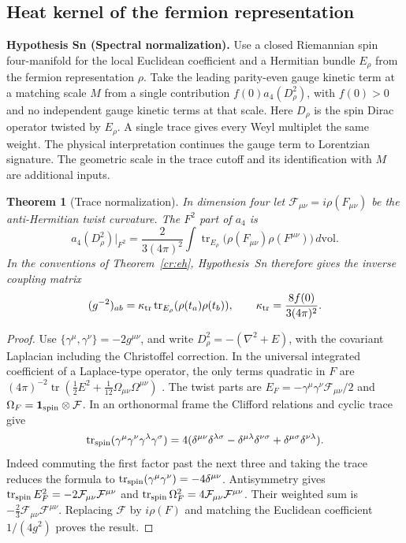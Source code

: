 \documentclass[aps,pra,onecolumn,superscriptaddress,nofootinbib,10pt]{revtex4-2}
\newtheorem{theorem}{Theorem}
\theoremstyle{definition}
\theoremstyle{remark}
\begin{document}
\subsection{Heat kernel of the fermion representation}

\smallskip\noindent\textbf{Hypothesis Sn (Spectral normalization).}  Use a closed Riemannian spin four-manifold for the local Euclidean
coefficient and a Hermitian bundle $E_\rho$ from the fermion
representation $\rho$. Take the leading parity-even gauge kinetic
term at a matching scale $M$ from a single contribution
$f(0)a_4(D_\rho^2)$, with $f(0)>0$ and no independent gauge kinetic
terms at that scale. Here $D_\rho$ is the spin Dirac operator twisted
by $E_\rho$. A single trace gives every Weyl multiplet the same weight.
The physical interpretation continues the gauge term to Lorentzian
signature. The geometric scale in the trace cutoff and its
identification with $M$ are additional inputs.


\begin{theorem}[Trace normalization]\label{cr:heat}
In dimension four let $\mathcal F_{\mu\nu}=i\rho(F_{\mu\nu})$
be the anti-Hermitian twist curvature. The $F^2$ part of $a_4$ is
\begin{equation}\label{cr:a4}
 a_4(D_\rho^2)\big|_{F^2}
   =\frac{2}{3(4\pi)^2}\int
            \operatorname{tr}_{E_\rho}
               \big(\rho(F_{\mu\nu})\rho(F^{\mu\nu})\big)\,d\mathrm{vol}.
\end{equation}
In the conventions of Theorem~\ref{cr:eh}, Hypothesis~Sn
therefore gives the inverse coupling matrix
\[
 (g^{-2})_{ab}
   =\kappa_{\rm tr}\operatorname{tr}_{E_\rho}(\rho(t_a)\rho(t_b)),
 \qquad \kappa_{\rm tr}=\frac{8f(0)}{3(4\pi)^2}.
\]
\end{theorem}
\begin{proof}
Use $\{\gamma^\mu,\gamma^\nu\}=-2g^{\mu\nu}$, and write
$D_\rho^2=-(\nabla^2+E)$, with the covariant Laplacian including
the Christoffel correction. In the universal integrated coefficient
of a Laplace-type operator, the only terms quadratic in $F$ are
$(4\pi)^{-2}\operatorname{tr}(\tfrac12 E^2+
\tfrac1{12}\Omega_{\mu\nu}\Omega^{\mu\nu})$
\cite[Eq.~(4.28)]{cr:vassilevich}. The twist parts are
$E_F=-\gamma^\mu\gamma^\nu\mathcal F_{\mu\nu}/2$ and
$\Omega_F=\mathbf 1_{\rm spin}\otimes\mathcal F$. In an orthonormal
frame the Clifford relations and cyclic trace give
\[
 \operatorname{tr}_{\rm spin}
   (\gamma^\mu\gamma^\nu\gamma^\lambda\gamma^\sigma)
 =4(\delta^{\mu\nu}\delta^{\lambda\sigma}
 -\delta^{\mu\lambda}\delta^{\nu\sigma}
 +\delta^{\mu\sigma}\delta^{\nu\lambda}).
\]
Indeed commuting the first factor past the next three and taking
the trace reduces the formula to
$\operatorname{tr}_{\rm spin}(\gamma^\mu\gamma^\nu)=-4\delta^{\mu\nu}$.
Antisymmetry gives
$\operatorname{tr}_{\rm spin}E_F^2=-2\mathcal F_{\mu\nu}\mathcal
F^{\mu\nu}$ and $\operatorname{tr}_{\rm spin}\Omega_F^2=4\mathcal
F_{\mu\nu}\mathcal F^{\mu\nu}$. Their weighted sum is
$-\tfrac23\mathcal F_{\mu\nu}\mathcal F^{\mu\nu}$. Replacing
$\mathcal F$ by $i\rho(F)$ and matching the Euclidean coefficient
$1/(4g^2)$ proves the result.
\end{proof}
\end{document}
